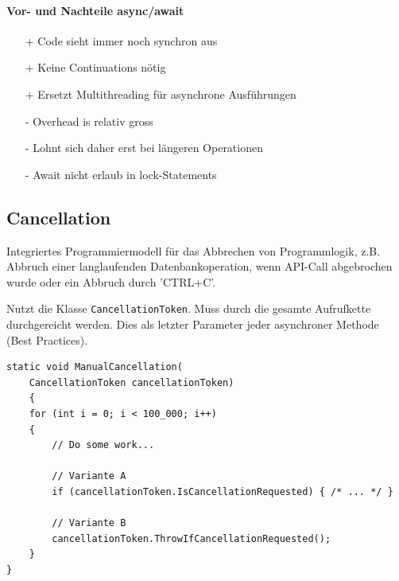 \documentclass[
a4paper,
oneside,
10pt,
fleqn,
headsepline,
toc=listofnumbered, 
bibliography=totocnumbered]{scrartcl}
\begin{document}
\paragraph{Vor- und Nachteile async/await}
\begin{itemize}
	\item[+] Code sieht immer noch synchron aus
	\item[+] Keine Continuations nötig
	\item[+] Ersetzt Multithreading für asynchrone Ausführungen
	\item[-] Overhead is relativ gross
	\item[-] Lohnt sich daher erst bei längeren Operationen
	\item[-] Await nicht erlaub in lock-Statements
\end{itemize}

\subsection{Cancellation}
Integriertes Programmiermodell für das Abbrechen von Programmlogik, z.B. Abbruch einer langlaufenden Datenbankoperation, wenn API-Call abgebrochen wurde oder ein Abbruch durch 'CTRL+C'.

Nutzt die Klasse \lstinline|CancellationToken|. Muss durch die gesamte Aufrufkette durchgereicht werden. Dies als letzter Parameter jeder asynchroner Methode (Best Practices).

\begin{lstlisting}
static void ManualCancellation(
	CancellationToken cancellationToken)
	{
	for (int i = 0; i < 100_000; i++)
	{
		// Do some work...

		// Variante A
		if (cancellationToken.IsCancellationRequested) { /* ... */ }

		// Variante B
		cancellationToken.ThrowIfCancellationRequested();
	}
}
\end{lstlisting}
\end{document}
